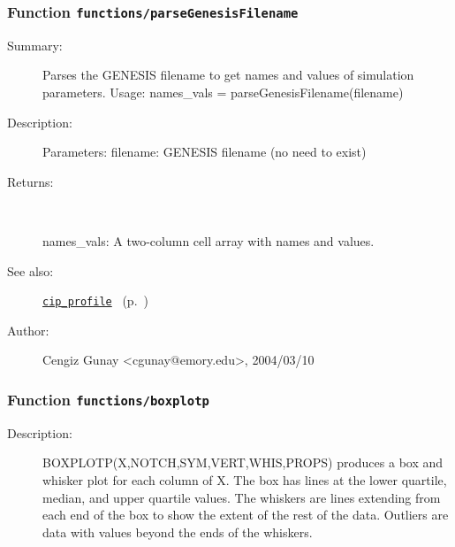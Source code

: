 \subsubsection[Function \texttt{parseGenesisFilename}]{Function \texttt{functions/parseGenesisFilename}}%
%
\label{ref_functions__parseGenesisFilename}%
\hypertarget{ref_functions__parseGenesisFilename}{}%
\begin{description}
\item[Summary:]Parses the GENESIS filename to get names and values of simulation parameters.
 Usage:
 names\_vals = parseGenesisFilename(filename)
%
%
\item[Description:]%
Parameters:
		filename: GENESIS filename (no need to exist)
%
\item[Returns:]~

		names\_vals: A two-column cell array with names and values.
%
%
\item[See also:]%
\hyperlink{ref_cip_profile}{\texttt{cip\_profile}}%
\ (p.~\pageref{ref_cip_profile})%
%
%
\item[Author:]%
Cengiz Gunay <cgunay@emory.edu>, 2004/03/10%
\end{description}
\methodline%
\subsubsection[Function \texttt{boxplotp}]{Function \texttt{functions/boxplotp}}%
%
\label{ref_functions__boxplotp}%
\hypertarget{ref_functions__boxplotp}{}%
\begin{description}
%
%
\item[Description:]%
BOXPLOTP(X,NOTCH,SYM,VERT,WHIS,PROPS) produces a box and whisker plot for
   each column of X. The box has lines at the lower quartile, median, 
   and upper quartile values. The whiskers are lines extending from 
   each end of the box to show the extent of the rest of the data. 
   Outliers are data with values beyond the ends of the whiskers.
%
%
%
%
%
\end{description}
\methodline%
